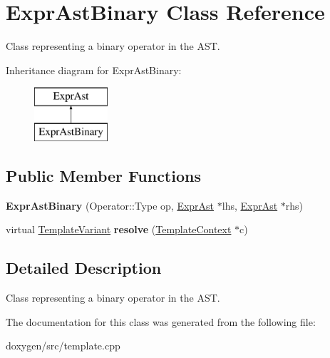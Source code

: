 \hypertarget{class_expr_ast_binary}{}\section{Expr\+Ast\+Binary Class Reference}
\label{class_expr_ast_binary}


Class representing a binary operator in the A\+ST.  


Inheritance diagram for Expr\+Ast\+Binary\+:\begin{figure}[H]
\begin{center}
\leavevmode
\includegraphics[height=2.000000cm]{class_expr_ast_binary}
\end{center}
\end{figure}
\subsection*{Public Member Functions}
\begin{DoxyCompactItemize}
\item 
\mbox{\label{class_expr_ast_binary_a80a29a859ce16fb7cbf1dace940a8f5b}} 
{\bfseries Expr\+Ast\+Binary} (Operator\+::\+Type op, \mbox{\hyperlink{class_expr_ast}{Expr\+Ast}} $\ast$lhs, \mbox{\hyperlink{class_expr_ast}{Expr\+Ast}} $\ast$rhs)
\item 
\mbox{\label{class_expr_ast_binary_a1061c5601a23daeba8a9fed7bc1e33b4}} 
virtual \mbox{\hyperlink{class_template_variant}{Template\+Variant}} {\bfseries resolve} (\mbox{\hyperlink{class_template_context}{Template\+Context}} $\ast$c)
\end{DoxyCompactItemize}


\subsection{Detailed Description}
Class representing a binary operator in the A\+ST. 

The documentation for this class was generated from the following file\+:\begin{DoxyCompactItemize}
\item 
doxygen/src/template.\+cpp\end{DoxyCompactItemize}
